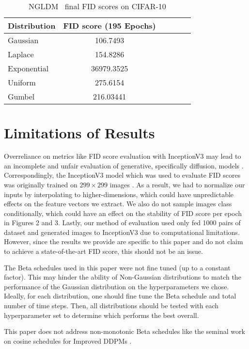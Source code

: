 \documentclass[10pt,twocolumn,letterpaper]{article}
\begin{document}
\begin{table}
  \centering
  \begin{tabular}{@{}lc@{}lc@{}lc@{}}
    \toprule
    Distribution & FID score (195 Epochs) \\
    \midrule
    Gaussian & 106.7493 \\
    Laplace & 154.8286 \\
    Exponential & 36979.3525 \\
    Uniform & 275.6154 \\
    Gumbel & 216.03441 \\
    \bottomrule
  \end{tabular}
  \caption{NGLDM ~final FID scores on CIFAR-10}
  \label{tab:example}
\end{table}


\section{Limitations of Results}
\label{sec:intro}

Overreliance on metrics like FID score evaluation with InceptionV3 may lead to an incomplete and unfair evaluation of generative, specifically diffusion, models \cite{stein2023exposing}. Correspondingly, the InceptionV3 model which was used to evaluate FID scores was originally trained on $299\times 299$ images \cite{DBLP:journals/corr/SzegedyVISW15}. As a result, we had to normalize our inputs by interpolating to higher-dimensions, which could have unpredictable effects on the feature vectors we extract. We also do not sample images class conditionally, which could have an effect on the stability of FID score per epoch in Figures 2 and 3. Lastly, our method of evaluation used only fed 1000 pairs of dataset and generated images to InceptionV3 due to computational limitations. However, since the results we provide are specific to this paper and do not claim to achieve a state-of-the-art FID score, this should not be an issue.

The Beta schedules used in this paper were not fine tuned (up to a constant factor). This may hinder the ability of Non-Gaussian distributions to match the performance of the Gaussian distribution on the hyperparameters we chose. Ideally, for each distribution, one should fine tune the Beta schedule and total number of time steps. Then, all distributions should be tested with each hyperparameter set to determine which performs the best overall.

This paper does not address non-monotonic Beta schedules like the seminal work on cosine schedules for Improved DDPMs \cite{DBLP:journals/corr/abs-2102-09672}.
\end{document}
